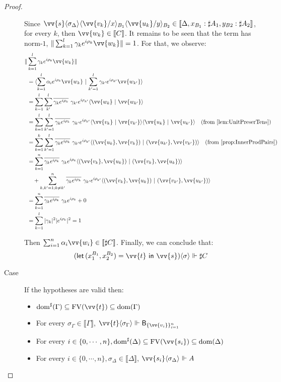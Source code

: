 \documentclass[runningheads,orivec,envcountsame,envcountsect]{llncs}
\newcommand\ansubst[2]{\ensuremath{\langle #1 \rangle_{#2}}}
\newcommand\dom[1]{\mathrm{dom}(#1)}
\newcommand\sdom[1]{\mathrm{dom}^{\sharp}(#1)}
\newcommand\FV[1]{\mathrm{FV}(#1)}
\def\scal#1#2{\langle{#1}~|~{#2}\rangle}
\def\Pair#1#2{(#1,#2)} %
\def\letkeyword{\mathsf{let}}
\def\inkeyword{\mathsf{in}}
\def\LetP#1#2#3#4#5#6{\letkeyword\,\Pair{#1^{#2}}{#3^{#4}}=#5~\inkeyword~#6}
\def\sem#1{\llbracket#1\rrbracket}
\def\real{\Vdash}
\newcommand\basis[1]{\ensuremath{\mathsf{B}_{#1}}}
\newcommand\genbasis[3]{\ensuremath{\basis{\{#1\}_{#2}^{#3}}}}
\begin{document}
\begin{proof}
\begin{description}
    Since $\vv{s}\ansubst{\sigma_\Delta}{}\ansubst{\vv{v_k}/x}{B_1}\ansubst{\vv{u_k}/y}{B_2}\in\sem{\Delta, x_{B_1}:\sharp A_1, y_{B2}:\sharp A_2}$, for every $k$, then $\vv{w_k}\in\sem{C}$. It remains to be seen that the term has norm-$1$, $\|\sum_{k=1}^{l}\gamma_k e^{i\rho_k} \vv{w_k}\|=1$. For that, we observe:
    \begin{align*}
        \|&\sum_{k=1}^{l}\gamma_k e^{i\rho_k} \vv{w_k}\| \\
        &= \scal{\sum_{k=1}^{l}\alpha_i e^{i\rho_k} \vv{w_k}}{\sum_{k'=1}^{l}\gamma_{k'} e^{i\rho_{k'}} \vv{w_{k'}}}\\
        &= \sum_{k=1}^{l}\sum_{k'}^{l}\overline{\gamma_k e^{i\rho_k}}\  \gamma_{k'} e^{i\rho_{k'}}\scal{\vv{w_k}}{\vv{w_{k'}}}\\
        &=\sum_{k=1}^{l}\sum_{k'=1}^{l}\overline{\gamma_k e^{i\rho_k}}\ \gamma_{k'} e^{i\rho_{k'}} \scal{\vv{v_k}}{\vv{v_{k'}}}\scal{\vv{u_k}}{\vv{u_{k'}}}\quad(\text{from \Cref{lem:UnitPreserTens}})\\
        &= \sum_{k=1}^{k}\sum_{k'=1}^{l}\overline{\gamma_k e^{i\rho_k}}\  \gamma_{k'} e^{i\rho_{k'}} \scal{\Pair{\vv{u_k}}{\vv{v_k}}}{\Pair{\vv{u_{k'}}}{\vv{v_{k'}}}}\quad(\text{from \Cref{prop:InnerProdPairs}})\\
        &=\sum_{k=1}^n \overline{\gamma_k e^{i\rho_k}}\ \gamma_k e^{i\rho_k} \scal{\Pair{\vv{v_k}}{\vv{u_k}}}{\Pair{\vv{v_k}}{\vv{u_k}}} \\
        & \quad + \sum_{k,k'=1; k\neq k'}^n \overline{\gamma_k e^{i\rho_k}}\  \gamma_{k'} e^{i\rho_{k'}} \scal{\Pair{\vv{v_k}}{\vv{u_k}}}{\Pair{\vv{v_{k'}}}{\vv{u_{k'}}}}\\
        &= \sum_{k=1}^n \overline{\gamma_k e^{i\rho_k}}\ \gamma_k e^{i\rho_k} + 0 \\
        &= \sum_{k=1}^{l} |\gamma_k|^2 |e^{i\rho_k}|^2 = 1
    \end{align*}

    Then $\sum_{i=1}^{n}\alpha_i\vv{w_i}\in\sem{\sharp C}$. Finally, we can conclude that: 
    \[(\LetP{x_1}{B_1}{x_2}{B_2}{\vv{t}}{\vv{s}})\ansubst{\sigma}{}\real{\sharp C}\]

    \item[Case] If the hypotheses are valid then:
    \begin{itemize}
        \item $\sdom{\Gamma}\subseteq \FV{\vv{t}}\subseteq \dom{\Gamma}$
        \item For every $\sigma_\Gamma\in\sem{\Gamma}$, $\vv{t}\ansubst{\sigma_\Gamma}{}\real\genbasis{\vv{v_i}}{i=1}{n}$
        \item For every $i\in\{0,\dotsb ,n\}, \sdom{\Delta}\subseteq \FV{\vv{s_i}}\subseteq \dom{\Delta}$
        \item For every $i\in\{0,\dotsb ,n\}, \sigma_\Delta\in\sem{\Delta}$, $\vv{s_i}\ansubst{\sigma_\Delta}{}\real A$
    \end{itemize}


\end{description}
\end{proof}
\end{document}
